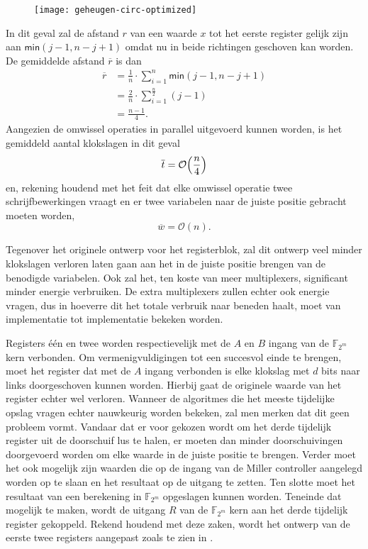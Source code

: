 \begin{figure}[h]
	\centering
		\texttt{[image: geheugen-circ-optimized]}
		\label{figuur-implementatie-miller-geheugen-circ-optimized}
\end{figure}

In dit geval zal de afstand $r$ van een waarde $x$ tot het eerste register gelijk zijn aan $\textsf{min}(j - 1, n - j + 1)$ omdat nu in beide richtingen geschoven kan worden. De gemiddelde afstand $\overline{r}$ is dan
\[\begin{aligned}
\overline{r}	&= \frac{1}{n} \cdot \sum_{i = 1}^{n} \textsf{min}(j - 1, n - j + 1)\\
	&= \frac{2}{n} \cdot \sum_{i = 1}^{\frac{n}{2}} (j - 1)\\
	&= \frac{n - 1}{4}.
\end{aligned}\]
Aangezien de omwissel operaties in parallel uitgevoerd kunnen worden, is het gemiddeld aantal klokslagen in dit geval
\[\overline{t} = \mathcal{O}  \Bigl( \frac{n}{4} \Bigr)\]
en, rekening houdend met het feit dat elke omwissel operatie twee schrijfbewerkingen vraagt en er twee variabelen naar de juiste positie gebracht moeten worden,
\[\overline{w} = \mathcal{O}(n).\]

Tegenover het originele ontwerp voor het registerblok, zal dit ontwerp veel minder klokslagen verloren laten gaan aan het in de juiste positie brengen van de benodigde variabelen. Ook zal het, ten koste van meer multiplexers, significant minder energie verbruiken. De extra multiplexers zullen echter ook energie vragen, dus in hoeverre dit het totale verbruik naar beneden haalt, moet van implementatie tot implementatie bekeken worden. 

Registers \'e\'en en twee worden respectievelijk met de $A$ en $B$ ingang van de $\mathbb{F}_{2^m}$ kern verbonden. Om vermenigvuldigingen tot een succesvol einde te brengen, moet het register dat met de $A$ ingang verbonden is elke klokslag met $d$ bits naar links doorgeschoven kunnen worden. Hierbij gaat de originele waarde van het register echter wel verloren. Wanneer de algoritmes die het meeste tijdelijke opslag vragen echter nauwkeurig worden bekeken, zal men merken dat dit geen probleem vormt. Vandaar dat er voor gekozen wordt om het derde tijdelijk register uit de doorschuif lus te halen, er moeten dan minder doorschuivingen doorgevoerd worden om elke waarde in de juiste positie te brengen. Verder moet het ook mogelijk zijn waarden die op de ingang van de Miller controller aangelegd worden op te slaan en het resultaat op de uitgang te zetten. Ten slotte moet het resultaat van een berekening in $\mathbb{F}_{2^m}$ opgeslagen kunnen worden. Teneinde dat mogelijk te maken, wordt de uitgang $R$ van de $\mathbb{F}_{2^m}$ kern aan het derde tijdelijk register gekoppeld. Rekend houdend met deze zaken, wordt het ontwerp van de eerste twee registers aangepast zoals te zien in .

